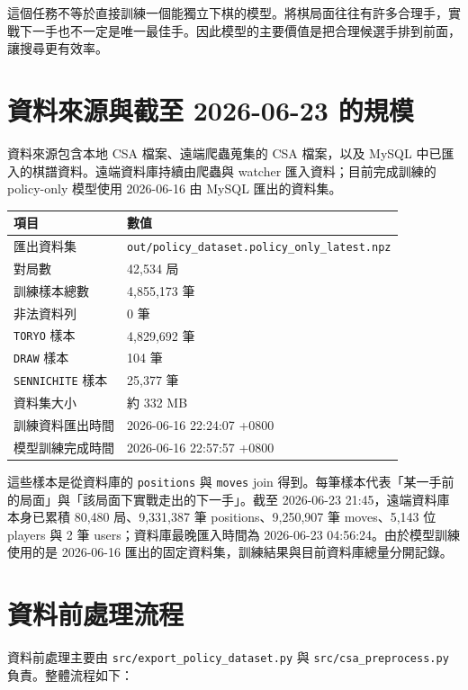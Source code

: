 \documentclass[12pt,a4paper,fontset=none]{ctexart}
\begin{document}
這個任務不等於直接訓練一個能獨立下棋的模型。將棋局面往往有許多合理手，實戰下一手也不一定是唯一最佳手。因此模型的主要價值是把合理候選手排到前面，讓搜尋更有效率。

\section{資料來源與截至 2026-06-23 的規模}

資料來源包含本地 CSA 檔案、遠端爬蟲蒐集的 CSA 檔案，以及 MySQL 中已匯入的棋譜資料。遠端資料庫持續由爬蟲與 watcher 匯入資料；目前完成訓練的 policy-only 模型使用 2026-06-16 由 MySQL 匯出的資料集。

\begin{longtable}{p{}p{}}
\toprule
\textbf{項目} & \textbf{數值}\\
\midrule
\endhead
匯出資料集 & \texttt{out/policy\_dataset.policy\_only\_latest.npz}\\
對局數 & 42,534 局\\
訓練樣本總數 & 4,855,173 筆\\
非法資料列 & 0 筆\\
\texttt{TORYO} 樣本 & 4,829,692 筆\\
\texttt{DRAW} 樣本 & 104 筆\\
\texttt{SENNICHITE} 樣本 & 25,377 筆\\
資料集大小 & 約 332 MB\\
訓練資料匯出時間 & 2026-06-16 22:24:07 +0800\\
模型訓練完成時間 & 2026-06-16 22:57:57 +0800\\
\bottomrule
\end{longtable}

這些樣本是從資料庫的 \texttt{positions} 與 \texttt{moves} join 得到。每筆樣本代表「某一手前的局面」與「該局面下實戰走出的下一手」。截至 2026-06-23 21:45，遠端資料庫本身已累積 80,480 局、9,331,387 筆 positions、9,250,907 筆 moves、5,143 位 players 與 2 筆 users；資料庫最晚匯入時間為 2026-06-23 04:56:24。由於模型訓練使用的是 2026-06-16 匯出的固定資料集，訓練結果與目前資料庫總量分開記錄。

\section{資料前處理流程}

資料前處理主要由 \texttt{src/export\_policy\_dataset.py} 與 \texttt{src/csa\_preprocess.py} 負責。整體流程如下：
\end{document}
